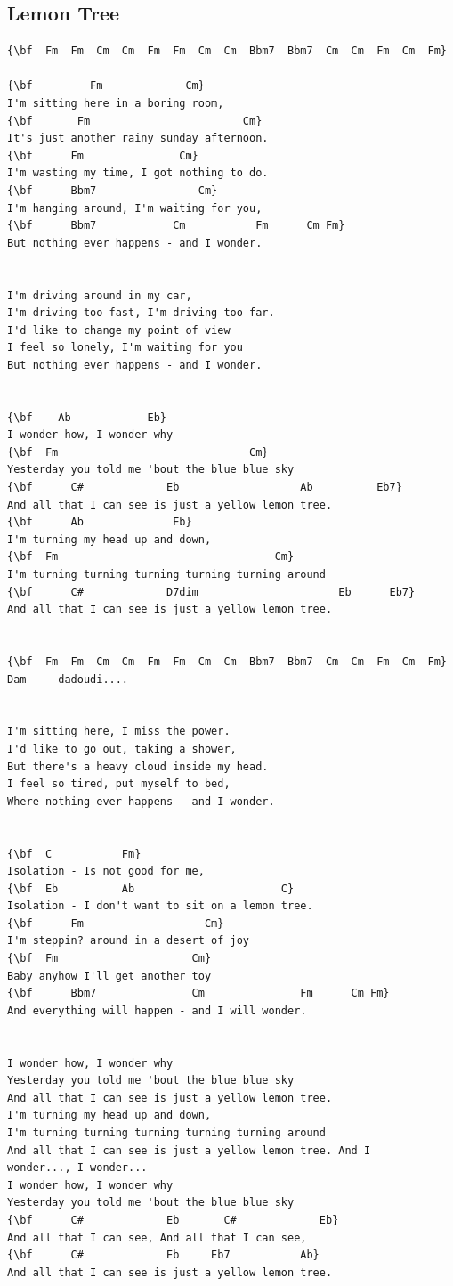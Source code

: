 \documentclass[a4paper]{article}
\begin{document}
\subsection{Lemon Tree}
\begin{Verbatim}[commandchars=\\\{\}]
{\bf  Fm  Fm  Cm  Cm  Fm  Fm  Cm  Cm  Bbm7  Bbm7  Cm  Cm  Fm  Cm  Fm}

{\bf         Fm             Cm}
I'm sitting here in a boring room,
{\bf       Fm                        Cm}
It's just another rainy sunday afternoon.
{\bf      Fm               Cm}
I'm wasting my time, I got nothing to do.
{\bf      Bbm7                Cm}
I'm hanging around, I'm waiting for you,
{\bf      Bbm7            Cm           Fm      Cm Fm}
But nothing ever happens - and I wonder.


I'm driving around in my car,
I'm driving too fast, I'm driving too far.
I'd like to change my point of view
I feel so lonely, I'm waiting for you
But nothing ever happens - and I wonder.


{\bf    Ab            Eb}
I wonder how, I wonder why
{\bf  Fm                              Cm}
Yesterday you told me 'bout the blue blue sky
{\bf      C#             Eb                   Ab          Eb7}
And all that I can see is just a yellow lemon tree.
{\bf      Ab              Eb}
I'm turning my head up and down,
{\bf  Fm                                  Cm}
I'm turning turning turning turning turning around
{\bf      C#             D7dim                      Eb      Eb7}
And all that I can see is just a yellow lemon tree.


{\bf  Fm  Fm  Cm  Cm  Fm  Fm  Cm  Cm  Bbm7  Bbm7  Cm  Cm  Fm  Cm  Fm}
Dam     dadoudi....


I'm sitting here, I miss the power.
I'd like to go out, taking a shower,
But there's a heavy cloud inside my head.
I feel so tired, put myself to bed,
Where nothing ever happens - and I wonder.


{\bf  C           Fm}
Isolation - Is not good for me,
{\bf  Eb          Ab                       C}
Isolation - I don't want to sit on a lemon tree.
{\bf      Fm                   Cm}
I'm steppin? around in a desert of joy
{\bf  Fm                     Cm}
Baby anyhow I'll get another toy
{\bf      Bbm7               Cm               Fm      Cm Fm}
And everything will happen - and I will wonder.


I wonder how, I wonder why
Yesterday you told me 'bout the blue blue sky
And all that I can see is just a yellow lemon tree.
I'm turning my head up and down,
I'm turning turning turning turning turning around
And all that I can see is just a yellow lemon tree. And I
wonder..., I wonder...
I wonder how, I wonder why
Yesterday you told me 'bout the blue blue sky
{\bf      C#             Eb       C#             Eb}
And all that I can see, And all that I can see,
{\bf      C#             Eb     Eb7           Ab}
And all that I can see is just a yellow lemon tree.

\end{Verbatim}
\newpage
\end{document}
